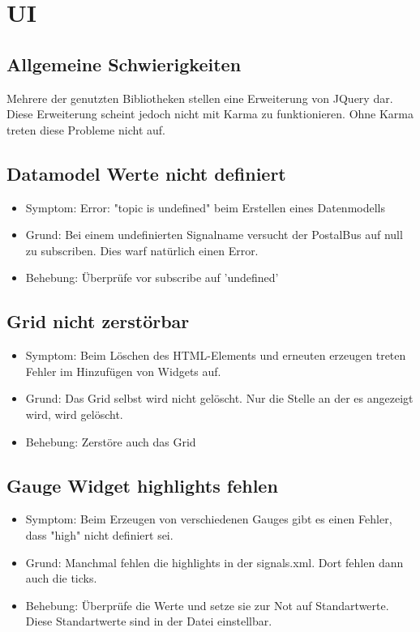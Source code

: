 \documentclass[qualitaetssicherung.tex]{subfiles}
\begin{document}
\section{UI}

	\subsection*{Allgemeine Schwierigkeiten}
		Mehrere der genutzten Bibliotheken stellen eine Erweiterung von JQuery dar. Diese Erweiterung scheint jedoch nicht mit Karma zu funktionieren. Ohne Karma treten diese Probleme nicht auf.

	\subsection{Datamodel Werte nicht definiert}
		\begin{itemize}
			\item
			Symptom: Error: "topic is undefined" beim Erstellen eines Datenmodells
			\item
			Grund: Bei einem undefinierten Signalname versucht der PostalBus auf null zu subscriben. Dies warf natürlich einen Error.
			\item
			Behebung: Überprüfe vor subscribe auf 'undefined'
		\end{itemize}
		
	\subsection{Grid nicht zerstörbar}
		\begin{itemize}
			\item
			Symptom: Beim Löschen des HTML-Elements und erneuten erzeugen treten Fehler im Hinzufügen von Widgets auf. 
			\item
			Grund: Das Grid selbst wird nicht gelöscht. Nur die Stelle an der es angezeigt wird, wird gelöscht.
			\item
			Behebung: Zerstöre auch das Grid
		\end{itemize}
		
	\subsection{Gauge Widget highlights fehlen}
	\begin{itemize}
		\item
		Symptom: Beim Erzeugen von verschiedenen Gauges gibt es einen Fehler, dass "high" nicht definiert sei.
		\item
		Grund: Manchmal fehlen die highlights in der signals.xml. Dort fehlen dann auch die ticks.
		\item
		Behebung: Überprüfe die Werte und setze sie zur Not auf Standartwerte. Diese Standartwerte sind in der Datei einstellbar.
	\end{itemize}	
	
\end{document}
